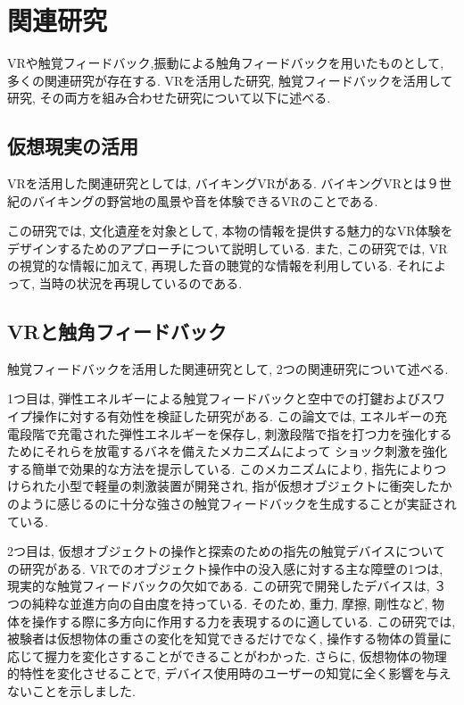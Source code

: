 \chapter{関連研究}	%
\thispagestyle{plain}   %

VRや触覚フィードバック,振動による触角フィードバックを用いたものとして, 多くの関連研究が存在する.
VRを活用した研究, 触覚フィードバックを活用して研究, その両方を組み合わせた研究について以下に述べる.

\section{仮想現実の活用}
VRを活用した関連研究としては, バイキングVR\cite{viking}がある.
バイキングVRとは９世紀のバイキングの野営地の風景や音を体験できるVRのことである.

この研究では, 文化遺産を対象として, 本物の情報を提供する魅力的なVR体験をデザインするためのアプローチについて説明している.
また, この研究では, VRの視覚的な情報に加えて, 再現した音の聴覚的な情報を利用している.
それによって, 当時の状況を再現しているのである.

\section{VRと触角フィードバック}
触覚フィードバックを活用した関連研究として, 2つの関連研究について述べる.

1つ目は, 弾性エネルギーによる触覚フィードバックと空中での打鍵およびスワイプ操作に対する有効性を検証した研究がある\cite{tactile}.
この論文では, エネルギーの充電段階で充電された弾性エネルギーを保存し, 刺激段階で指を打つ力を強化するためにそれらを放電するバネを備えたメカニズムによって
ショック刺激を強化する簡単で効果的な方法を提示している.
このメカニズムにより, 指先によりつけられた小型で軽量の刺激装置が開発され, 指が仮想オブジェクトに衝突したかのように感じるのに十分な強さの触覚フィードバックを生成することが実証されている.

2つ目は, 仮想オブジェクトの操作と探索のための指先の触覚デバイス\cite{figertip}についての研究がある.
VRでのオブジェクト操作中の没入感に対する主な障壁の1つは, 現実的な触覚フィードバックの欠如である.
この研究で開発したデバイスは, ３つの純粋な並進方向の自由度を持っている.
そのため, 重力, 摩擦, 剛性など, 物体を操作する際に多方向に作用する力を表現するのに適している.
この研究では, 被験者は仮想物体の重さの変化を知覚できるだけでなく, 操作する物体の質量に応じて握力を変化さすることができることがわかった.
さらに, 仮想物体の物理的特性を変化させることで, デバイス使用時のユーザーの知覚に全く影響を与えないことを示しました.


